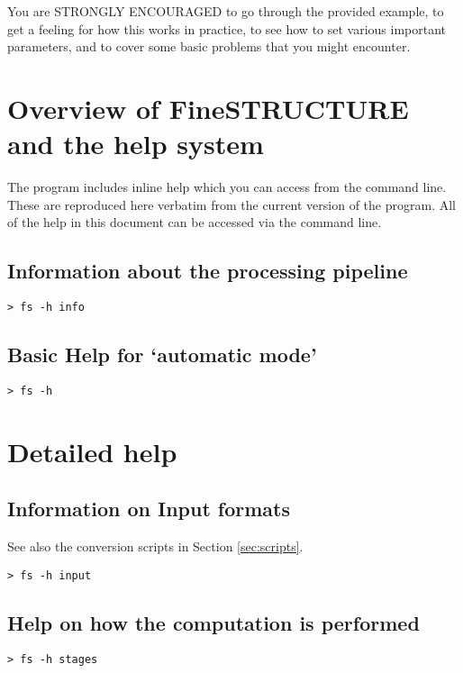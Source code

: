 \documentclass[11pt]{article}
\begin{document}
You are STRONGLY ENCOURAGED to go through the provided example, to get a feeling for how this works in practice, to see how to set various important parameters, and to cover some basic problems that you might encounter.

\section{Overview of FineSTRUCTURE and the help system}

The program includes inline help which you can access from the command line. These are reproduced here verbatim from the current version of the program. All of the help in this document can be accessed via the command line.

\subsection{Information about the processing pipeline}
\begin{lstlisting}[caption=Overview help]
> fs -h info
\end{lstlisting}


\subsection{Basic Help for `automatic mode'}
\begin{lstlisting}[caption=Basic Help]
> fs -h
\end{lstlisting}


\section{Detailed help}

\subsection{Information on Input formats}
\label{subsec:input}
See also the conversion scripts in Section \ref{sec:scripts}.
\begin{lstlisting}[caption=Input help)]
> fs -h input
\end{lstlisting}


\subsection{Help on how the computation is performed}
\begin{lstlisting}[caption=Help on what happens during each processing stage]
> fs -h stages
\end{lstlisting}

\end{document}
